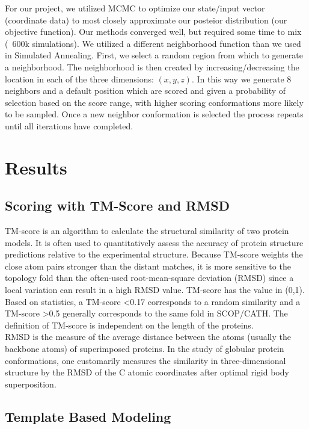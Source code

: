 \documentclass{article}
\begin{document}
For our project, we utilized MCMC to optimize our state/input vector (coordinate data) to most closely approximate our posteior distribution (our objective function).  Our methods converged well, but required some time to mix (~600k simulations).  We utilized a different neighborhood function than we used in Simulated Annealing.  First, we select a random region from which to generate a neighborhood. The neighborhood is then created by increasing/decreasing the location in each of the three dimensions: $(x, y, z)$. In this way we generate 8 neighbors and a default position which are scored and given a probability of selection based on the score range, with higher scoring conformations more likely to be sampled. Once a new neighbor conformation is selected the process repeats until all iterations have completed.


\section{Results}

\subsection{Scoring with TM-Score and RMSD}

TM-score is an algorithm to calculate the structural similarity of two protein models. It is often used to quantitatively assess the accuracy of protein structure predictions relative to the experimental structure. Because TM-score weights the close atom pairs stronger than the distant matches, it is more sensitive to the topology fold than the often-used root-mean-square deviation (RMSD) since a local variation can result in a high RMSD value. TM-score has the value in (0,1). Based on statistics, a TM-score <0.17 corresponds to a random similarity and a TM-score >0.5 generally corresponds to the same fold in SCOP/CATH. The definition of TM-score is independent on the length of the proteins.\\

RMSD is the measure of the average distance between the atoms (usually the backbone atoms) of superimposed proteins. In the study of globular protein conformations, one customarily measures the similarity in three-dimensional structure by the RMSD of the C atomic coordinates after optimal rigid body superposition.


\subsection{Template Based Modeling}
\end{document}
